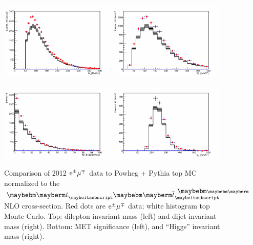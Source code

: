 \begin{figure}[!htb]
  \centerline{
    \includegraphics[width=0.49\textwidth]{plots/emu_zllm1_4}
    \includegraphics[width=0.49\textwidth]{plots/emu_zjjm2_4}
  }
  \centerline{
    \includegraphics[width=0.49\textwidth]{plots/emu_mets2_4}
    \includegraphics[width=0.49\textwidth]{plots/emu_hm3_4}
  }
  \caption{\label{figap:emudata2}Comparison of 2012 $\mathrm{e}^\pm\mu^\mp$ data to
    Powheg + Pythia top MC normalized to the $\Pqt \Paqt$ NLO cross-section.
    Red dots are $\mathrm{e}^\pm\mu^\mp$ data; white histogram top Monte Carlo. Top:
    dilepton invariant mass (left) and dijet invariant mass
    (right). Bottom: MET significance (left), and ``Higgs'' invariant
   mass  (right).}
\end{figure}

